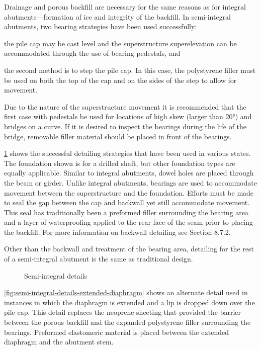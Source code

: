 Drainage and porous backfill are necessary for the same reasons as for integral abutments—formation of ice and integrity of the backfill. In semi-integral abutments, two bearing strategies have been used successfully: 
\begin{enumerate*}
  \item the pile cap may be cast level and the superstructure superelevation can be accommodated through the use of bearing pedestals, and 
  \item the second method is to step the pile cap. In this case, the polystyrene filler must be used on both the top of the cap and on the sides of the step to allow for movement. 
\end{enumerate*}
Due to the nature of the superstructure movement it is recommended that the first case with pedestals be used for locations of high skew (larger than 20°) and bridges on a curve. If it is desired to inspect the bearings during the life of the bridge, removable filler material should be placed in front of the bearings.

\cref{fig:semi-integral-details} shows the successful detailing strategies that have been used in various states. The foundation shown is for a drilled shaft, but other foundation types are equally applicable. Similar to integral abutments, dowel holes are placed through the beam or girder. Unlike integral abutments, bearings are used to accommodate movement between the superstructure and the foundation. Efforts must be made to seal the gap between the cap and backwall yet still accommodate movement. This seal has traditionally been a preformed filler surrounding the bearing area and a layer of waterproofing applied to the rear face of the seam prior to placing the backfill. For more information on backwall detailing see Section 8.7.2.

Other than the backwall and treatment of the bearing area, detailing for the rest of a semi-integral abutment is the same as traditional design.

\begin{figure}
  \caption{Semi-integral details}
  \label{fig:semi-integral-details}
\end{figure}

\cref{fig:semi-integral-details-extended-diaphragm} shows an alternate detail used in instances in which the diaphragm is extended and a lip is dropped
down over the pile cap. This detail replaces the neoprene sheeting that provided the barrier between the porous
backfill and the expanded polystyrene filler surrounding the bearings. Preformed elastomeric material is placed
between the extended diaphragm and the abutment stem.

